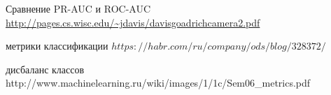 \begin{thebibliography}{9}
Сравнение PR-AUC и ROC-AUC
\url{http://pages.cs.wisc.edu/~jdavis/davisgoadrichcamera2.pdf}

метрики классификации
$https://habr.com/ru/company/ods/blog/328372/$

дисбаланс классов
http://www.machinelearning.ru/wiki/images/1/1c/Sem06_metrics.pdf


\end{thebibliography}
